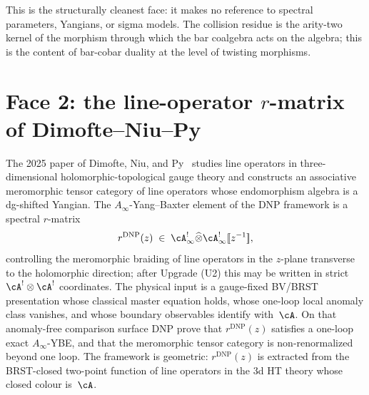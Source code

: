 This is the structurally cleanest face: it makes no reference to
spectral parameters, Yangians, or sigma models. The collision
residue is the arity-two kernel of the morphism through which the bar
coalgebra acts on the algebra; this is the content of bar-cobar
duality at the level of twisting morphisms.

\section{Face 2: the line-operator $r$-matrix of Dimofte--Niu--Py}
\label{sec:hdm-face-2}

The 2025 paper of Dimofte, Niu, and Py~\cite{DNP25} studies line
operators in three-dimensional holomorphic-topological gauge theory
and constructs an associative meromorphic tensor category of line
operators whose endomorphism algebra is a dg-shifted Yangian. The
$A_\infty$-Yang--Baxter element of the DNP framework is a spectral
$r$-matrix
\begin{equation}\label{eq:hdm-dnp-rmatrix}
r^{\mathrm{DNP}}(z)
\;\in\;
\cA^{!}_\infty \widehat{\otimes} \cA^{!}_\infty [\![z^{-1}]\!],
\end{equation}
controlling the meromorphic braiding of line operators in the
$z$-plane transverse to the holomorphic direction; after Upgrade
\textup{(U2)} this may be written in strict
$\cA^!\otimes\cA^!$ coordinates. The physical input is a gauge-fixed
BV/BRST presentation whose classical master equation holds, whose
one-loop local anomaly class vanishes, and whose boundary observables
identify with~$\cA$. On that anomaly-free comparison surface DNP
prove that $r^{\mathrm{DNP}}(z)$ satisfies a one-loop exact
$A_\infty$-YBE, and that the meromorphic tensor category is
non-renormalized beyond one loop. The framework is geometric:
$r^{\mathrm{DNP}}(z)$ is extracted from the BRST-closed two-point
function of line operators in the 3d HT theory whose closed colour
is~$\cA$.

